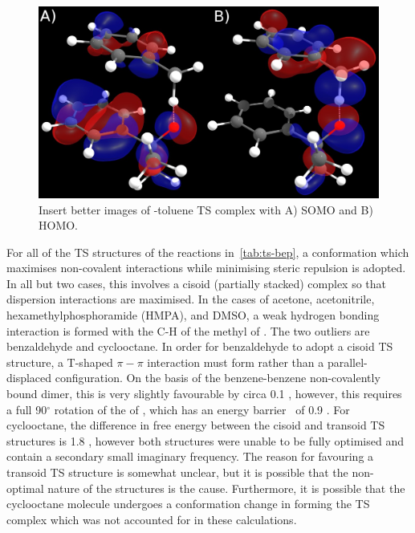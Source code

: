 \begin{figure}[htb]
  \includegraphics[width=\textwidth]{figures/cumo-toluene}
  \caption{Insert better images of \cumo-toluene TS complex with A) SOMO and B) HOMO.}
  \label{fig:cumo-toluene}
\end{figure}

For all of the TS structures of the reactions in~\ref{tab:ts-bep}, a conformation which maximises non-covalent interactions while minimising steric repulsion is adopted. In all but two cases, this involves a cisoid (partially stacked) complex so that dispersion interactions are maximised. In the cases of acetone, acetonitrile, hexamethylphosphoramide (HMPA), and DMSO, a weak hydrogen bonding interaction is formed with the C-H of the methyl of \cumo. The two outliers are benzaldehyde and cyclooctane. In order for benzaldehyde to adopt a cisoid TS structure, a T-shaped $\pi-\pi$ interaction must form rather than a parallel-displaced configuration. On the basis of the benzene-benzene non-covalently bound dimer,\cite{Sinnokrot2002} this is very slightly favourable by circa 0.1 \kcalmol, however, this requires a full 90$^\circ$ rotation of the  of \cumo, which has an energy barrier\footnotemark~ of 0.9 \kcalmol.  For cyclooctane, the difference in free energy between the cisoid and transoid TS structures is 1.8 \kcalmol, however both structures were unable to be fully optimised and contain a secondary small imaginary frequency. The reason for favouring a transoid TS structure is somewhat unclear, but it is possible that the non-optimal nature of the structures is the cause. Furthermore, it is possible that the cyclooctane molecule undergoes a conformation change in forming the TS complex which was not accounted for in these calculations.


